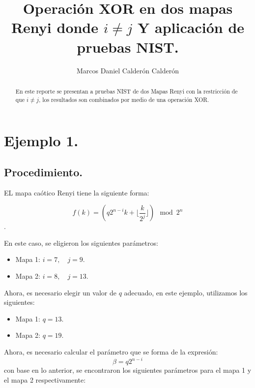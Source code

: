 \documentclass[12pt,3p]{elsarticle}
\begin{document}
\begin{frontmatter}

\title{Operación XOR en dos mapas Renyi donde $i \neq j$ Y aplicación de pruebas NIST.}



\author{Marcos Daniel Calderón Calderón}







\begin{abstract}
En este reporte se presentan a pruebas NIST de dos Mapas Renyi con la restricción de que $i \neq j $, los resultados son combinados por medio de una operación XOR.
\end{abstract}



\end{frontmatter}

\section{Ejemplo 1.}

\subsection{Procedimiento.}
EL mapa caótico Renyi tiene la siguiente forma:

\begin{equation}
f(k)=  \left(  q2^{n-i}k +  \lfloor \frac{k}{2^{j}} \rfloor   \right) \mod{ 2^{n}}
\end{equation}.

En este caso, se eligieron los siguientes parámetros:


\begin{itemize}
\item Mapa 1: $i =7, \quad j = 9$.


\item Mapa 2: $i =8, \quad j = 13$.
\end{itemize}

Ahora, es necesario elegir un valor de $q$ adecuado, en este ejemplo, utilizamos los siguientes:

\begin{itemize}
\item Mapa 1: $q = 13$.
\item Mapa 2: $q = 19$.
\end{itemize}


Ahora, es necesario calcular el parámetro que se forma de la expresión:  
\begin{equation}
\beta = q 2^{n-i}
\end{equation}
con base en lo anterior, se encontraron los siguientes parámetros para el mapa 1 y el mapa 2 respectivamente:
\end{document}
